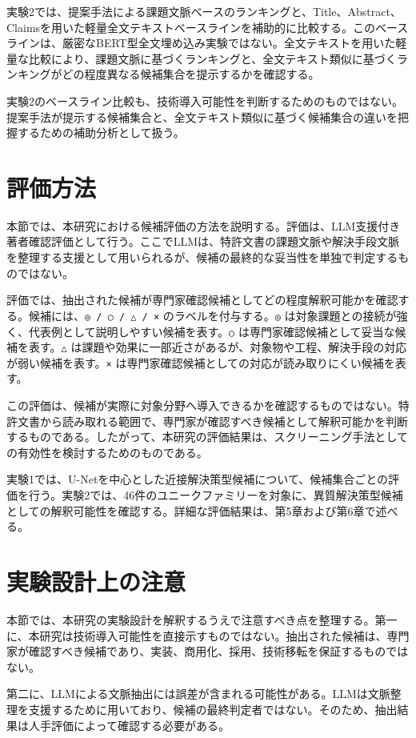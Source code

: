 実験2では、提案手法による課題文脈ベースのランキングと、Title、Abstract、Claimsを用いた軽量全文テキストベースラインを補助的に比較する。このベースラインは、厳密なBERT型全文埋め込み実験ではない。全文テキストを用いた軽量な比較により、課題文脈に基づくランキングと、全文テキスト類似に基づくランキングがどの程度異なる候補集合を提示するかを確認する。

実験2のベースライン比較も、技術導入可能性を判断するためのものではない。提案手法が提示する候補集合と、全文テキスト類似に基づく候補集合の違いを把握するための補助分析として扱う。

\section{評価方法}

本節では、本研究における候補評価の方法を説明する。評価は、LLM支援付き著者確認評価として行う。ここでLLMは、特許文書の課題文脈や解決手段文脈を整理する支援として用いられるが、候補の最終的な妥当性を単独で判定するものではない。

評価では、抽出された候補が専門家確認候補としてどの程度解釈可能かを確認する。候補には、\texttt{◎ / ○ / △ / ×} のラベルを付与する。\texttt{◎} は対象課題との接続が強く、代表例として説明しやすい候補を表す。\texttt{○} は専門家確認候補として妥当な候補を表す。\texttt{△} は課題や効果に一部近さがあるが、対象物や工程、解決手段の対応が弱い候補を表す。\texttt{×} は専門家確認候補としての対応が読み取りにくい候補を表す。

この評価は、候補が実際に対象分野へ導入できるかを確認するものではない。特許文書から読み取れる範囲で、専門家が確認すべき候補として解釈可能かを判断するものである。したがって、本研究の評価結果は、スクリーニング手法としての有効性を検討するためのものである。

実験1では、U-Netを中心とした近接解決策型候補について、候補集合ごとの評価を行う。実験2では、46件のユニークファミリーを対象に、異質解決策型候補としての解釈可能性を確認する。詳細な評価結果は、第5章および第6章で述べる。

\section{実験設計上の注意}

本節では、本研究の実験設計を解釈するうえで注意すべき点を整理する。第一に、本研究は技術導入可能性を直接示すものではない。抽出された候補は、専門家が確認すべき候補であり、実装、商用化、採用、技術移転を保証するものではない。

第二に、LLMによる文脈抽出には誤差が含まれる可能性がある。LLMは文脈整理を支援するために用いており、候補の最終判定者ではない。そのため、抽出結果は人手評価によって確認する必要がある。

